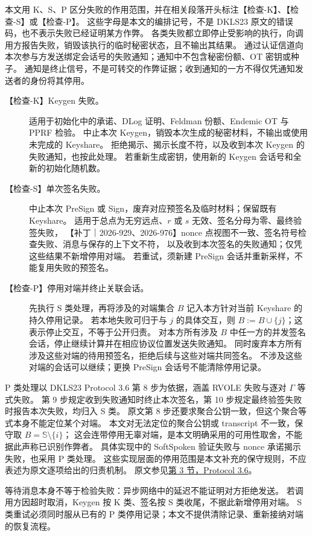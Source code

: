 本文用 K、S、P 区分失败的作用范围，并在相关段落开头标注【检查-K】、【检查-S】或【检查-P】。
这些字母是本文的编排记号，不是 DKLS23 原文的错误码，也不表示失败已经证明某方作弊。
各类失败都立即停止受影响的执行，向调用方报告失败，销毁该执行的临时秘密状态，且不输出其结果。
通过认证信道向本次参与方发送绑定会话号的失败通知；通知中不包含秘密份额、OT 密钥或种子。
通知是终止信号，不是可转交的作弊证据；收到通知的一方不得仅凭通知发送者的身份将其停用。

\begin{description}
\item[【检查-K】Keygen 失败。]
  适用于初始化中的承诺、DLog 证明、Feldman 份额、Endemic OT 与 PPRF 检验。
  中止本次 Keygen，销毁本次生成的秘密材料，不输出或使用未完成的 Keyshare。
  拒绝揭示、揭示长度不符，以及收到本次 Keygen 的失败通知，也按此处理。
  若重新生成密钥，使用新的 Keygen 会话号和全新的初始化随机数。
\item[【检查-S】单次签名失败。]
  中止本次 PreSign 或 Sign，废弃对应预签名及临时材料；保留既有 Keyshare。
  适用于总点为无穷远点、$r$ 或 $s$ 无效、签名分母为零、最终验签失败，
  【补丁｜2026-929、2026-976】nonce 点视图不一致、签名符号检查失败、消息与保存的上下文不符，
  以及收到本次签名的失败通知；仅凭这些结果不新增停用对端。
  若重试，须新建 PreSign 会话并重新采样，不能复用失败的预签名。
\item[【检查-P】停用对端并终止关联会话。]
  先执行 S 类处理，再将涉及的对端集合 $B$ 记入本方针对当前 Keyshare 的持久停用记录。
  若本地失败可归于与 $j$ 的具体交互，则 $B:=B\cup \{j\}$；这表示停止交互，不等于公开归责。
  对本方所有涉及 $B$ 中任一方的并发签名会话，停止继续计算并在相应协议位置发送失败通知。
  同时废弃本方所有涉及这些对端的待用预签名，拒绝后续与这些对端共同签名。
  不涉及这些对端的会话可以继续；更换 PreSign 会话号不能清除停用记录。
\end{description}

P 类处理以 DKLS23 Protocol 3.6 第 8 步为依据，涵盖 RVOLE 失败与逐对 $\Gamma$ 等式失败。
第 9 步规定收到失败通知时终止本次签名，第 10 步规定最终验签失败时报告本次失败，均归入 S 类。
原文第 8 步还要求聚合公钥一致，但这个聚合等式本身不能定位某个对端。
本文对无法定位的聚合公钥或 transcript 不一致，保守取 $B=\mathbb S\setminus\{i\}$；
这会连带停用无辜对端，是本文明确采用的可用性取舍，不能据此声称已识别作弊者。
具体实现中的 SoftSpoken 验证失败与 nonce 承诺揭示失败，也采用 P 类处理。
这些实现层面的停用范围是本文补充的保守规则，不应表述为原文逐项给出的归责机制。
原文参见\href{https://eprint.iacr.org/2023/765.pdf}{第 3 节，Protocol 3.6}。

等待消息本身不等于检验失败：异步网络中的延迟不能证明对方拒绝发送。
若调用方因超时取消，Keygen 按 K 类、签名按 S 类收尾，不据此新增停用对端。
S 类重试必须同时服从已有的 P 类停用记录；本文不提供清除记录、重新接纳对端的恢复流程。

